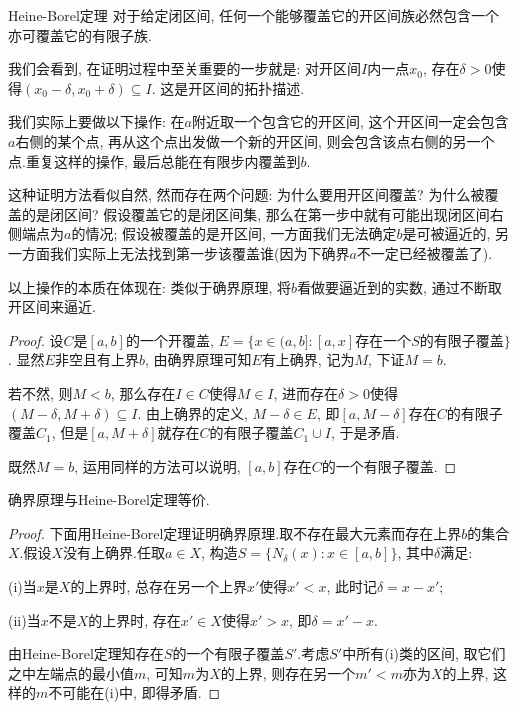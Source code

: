 \begin{theorem}{Heine-Borel定理}
	对于给定闭区间, 任何一个能够覆盖它的开区间族必然包含一个亦可覆盖它的有限子族.
\end{theorem}
\begin{remark}
	我们会看到, 在证明过程中至关重要的一步就是: 对开区间$I$内一点$x_0$, 存在$\delta >0$使得$(x_0-\delta ,x_0+\delta) \subseteq I$. 这是开区间的拓扑描述. 
\end{remark}
\begin{hint}
	我们实际上要做以下操作: 在$a$附近取一个包含它的开区间, 这个开区间一定会包含$a$右侧的某个点, 再从这个点出发做一个新的开区间, 则会包含该点右侧的另一个点.重复这样的操作, 最后总能在有限步内覆盖到$b$.
	
	这种证明方法看似自然, 然而存在两个问题: 为什么要用开区间覆盖? 为什么被覆盖的是闭区间? 假设覆盖它的是闭区间集, 那么在第一步中就有可能出现闭区间右侧端点为$a$的情况; 假设被覆盖的是开区间, 一方面我们无法确定$b$是可被逼近的, 另一方面我们实际上无法找到第一步该覆盖谁(因为下确界$a$不一定已经被覆盖了).
	
	以上操作的本质在体现在: 类似于确界原理, 将$b$看做要逼近到的实数, 通过不断取开区间来逼近.
\end{hint}
\begin{proof}
	设$C$是$[a,b]$的一个开覆盖, $E=\{ x \in (a, b]: [a, x]\text{存在一个$S$的有限子覆盖} \}$. 显然$E$非空且有上界$b$, 由确界原理可知$E$有上确界, 记为$M$, 下证$M=b$. 
	
	若不然, 则$M<b$, 那么存在$I \in C$使得$M \in I$, 进而存在$\delta >0$使得$(M-\delta ,M+\delta) \subseteq I$. 由上确界的定义, $M-\delta \in E$, 即$[a,M-\delta]$存在$C$的有限子覆盖$C_1$, 但是$[a,M+\delta]$就存在$C$的有限子覆盖$C_1 \cup I$, 于是矛盾. 
	
	既然$M=b$, 运用同样的方法可以说明, $[a,b]$存在$C$的一个有限子覆盖. 
\end{proof}

\begin{proposition}{}
	确界原理与Heine-Borel定理等价.
\end{proposition}
\begin{proof}
	下面用Heine-Borel定理证明确界原理.取不存在最大元素而存在上界$b$的集合$X$.假设$X$没有上确界.任取$a \in X$, 构造$S=\{ N_{\delta}(x): x \in [a, b] \}$, 其中$\delta$满足: 
	
	(i)当$x$是$X$的上界时, 总存在另一个上界$x'$使得$x'<x$, 此时记$\delta =x-x'$; 
	
	(ii)当$x$不是$X$的上界时, 存在$x' \in X$使得$x'>x$, 即$\delta = x'-x$.
	
	由Heine-Borel定理知存在$S$的一个有限子覆盖$S'$.考虑$S'$中所有(i)类的区间, 取它们之中左端点的最小值$m$, 可知$m$为$X$的上界, 则存在另一个$m'<m$亦为$X$的上界, 这样的$m$不可能在(i)中, 即得矛盾.
\end{proof}

